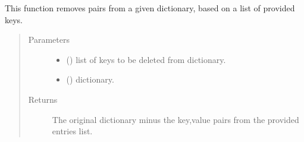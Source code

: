 \documentclass[letterpaper,10pt,english]{sphinxmanual}
\begin{document}
\begin{fulllineitems}
\label{\detokenize{_autosummary/graphdb_builder.ontologies:graphdb_builder.ontologies.ontologies_controller.entries_to_remove}}
This function removes pairs from a given dictionary, based on a list of provided keys.
\begin{quote}\begin{description}
\item[{Parameters}] \leavevmode\begin{itemize}
\item {} 
 () \textendash{} list of keys to be deleted from dictionary.

\item {} 
 () \textendash{} dictionary.

\end{itemize}

\item[{Returns}] \leavevmode
The original dictionary minus the key,value pairs from the provided entries list.

\end{description}\end{quote}

\end{fulllineitems}


\begin{fulllineitems}
\label{\detokenize{_autosummary/graphdb_builder.ontologies:graphdb_builder.ontologies.ontologies_controller.get_extra_entities_rels}}
\end{fulllineitems}
\end{document}
